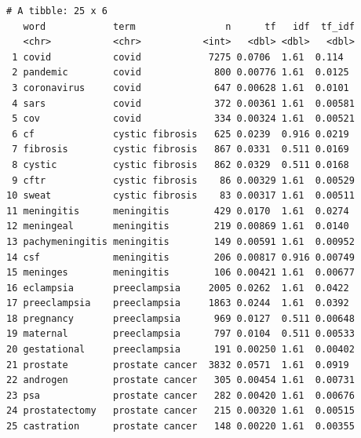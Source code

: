 \documentclass[
  letterpaper,
  DIV=11,
  numbers=noendperiod]{scrartcl}
\begin{document}
\begin{verbatim}
# A tibble: 25 x 6
   word            term                n      tf   idf  tf_idf
   <chr>           <chr>           <int>   <dbl> <dbl>   <dbl>
 1 covid           covid            7275 0.0706  1.61  0.114  
 2 pandemic        covid             800 0.00776 1.61  0.0125 
 3 coronavirus     covid             647 0.00628 1.61  0.0101 
 4 sars            covid             372 0.00361 1.61  0.00581
 5 cov             covid             334 0.00324 1.61  0.00521
 6 cf              cystic fibrosis   625 0.0239  0.916 0.0219 
 7 fibrosis        cystic fibrosis   867 0.0331  0.511 0.0169 
 8 cystic          cystic fibrosis   862 0.0329  0.511 0.0168 
 9 cftr            cystic fibrosis    86 0.00329 1.61  0.00529
10 sweat           cystic fibrosis    83 0.00317 1.61  0.00511
11 meningitis      meningitis        429 0.0170  1.61  0.0274 
12 meningeal       meningitis        219 0.00869 1.61  0.0140 
13 pachymeningitis meningitis        149 0.00591 1.61  0.00952
14 csf             meningitis        206 0.00817 0.916 0.00749
15 meninges        meningitis        106 0.00421 1.61  0.00677
16 eclampsia       preeclampsia     2005 0.0262  1.61  0.0422 
17 preeclampsia    preeclampsia     1863 0.0244  1.61  0.0392 
18 pregnancy       preeclampsia      969 0.0127  0.511 0.00648
19 maternal        preeclampsia      797 0.0104  0.511 0.00533
20 gestational     preeclampsia      191 0.00250 1.61  0.00402
21 prostate        prostate cancer  3832 0.0571  1.61  0.0919 
22 androgen        prostate cancer   305 0.00454 1.61  0.00731
23 psa             prostate cancer   282 0.00420 1.61  0.00676
24 prostatectomy   prostate cancer   215 0.00320 1.61  0.00515
25 castration      prostate cancer   148 0.00220 1.61  0.00355
\end{verbatim}
\end{document}

